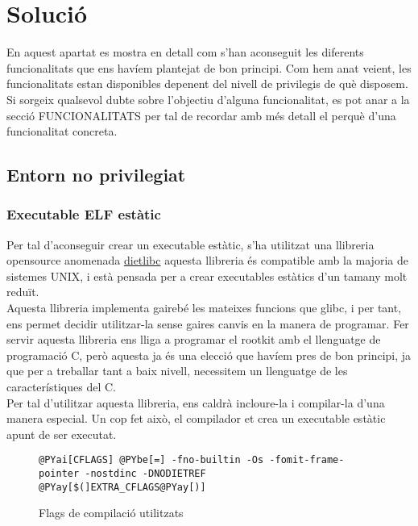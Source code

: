 \chapter{Solució}

En aquest apartat es mostra en detall com s'han aconseguit les diferents funcionalitats que ens havíem plantejat de bon principi.
Com hem anat veient, les funcionalitats estan disponibles depenent del nivell de privilegis de què disposem. \\

Si sorgeix qualsevol dubte sobre l'objectiu d'alguna funcionalitat, es pot anar a la secció FUNCIONALITATS per tal de recordar amb més 
detall el perquè d'una funcionalitat concreta. \\

\section{Entorn no privilegiat}

\subsection{Executable ELF estàtic}

Per tal d'aconseguir crear un executable estàtic, s'ha utilitzat una llibreria opensource anomenada 
\href{http://www.google.es/url?sa=t&source=web&ct=res&cd=1&url=http%3A%2F%2Fwww.fefe.de%2Fdietlibc%2F&ei=zZRQStz4PMWrjAftmrinBQ&usg=AFQjCNFno9JYqJ06mbfgwKIZS5J-6zPYEw&sig2=WuvuDzhCaMMslcwtL4xa2A}{dietlibc}
aquesta llibreria és compatible amb la majoria de sistemes UNIX, i està pensada per a crear executables estàtics d'un tamany 
molt reduït. \\

Aquesta llibreria implementa gairebé les mateixes funcions que glibc, i per tant, ens permet decidir utilitzar-la sense gaires canvis en la manera de programar. Fer servir aquesta llibreria
ens lliga a programar el rootkit amb el llenguatge de programació C, però aquesta ja és una elecció que havíem pres de bon principi, ja que per a treballar tant a baix nivell,
necessitem un llenguatge de les característiques del C.\\

Per tal d'utilitzar aquesta llibreria, ens caldrà incloure-la i compilar-la d'una manera especial. Un cop fet això, el compilador et crea un executable estàtic apunt de ser executat.
\begin{figure}[htp]
\begin{Verbatim}[commandchars=@\[\]]
@PYai[CFLAGS] @PYbe[=] -fno-builtin -Os -fomit-frame-pointer -nostdinc -DNODIETREF  @PYay[$(]EXTRA_CFLAGS@PYay[)] 
\end{Verbatim}
\caption{Flags de compilació utilitzats}
\label{fig:cflags}
\end{figure}

